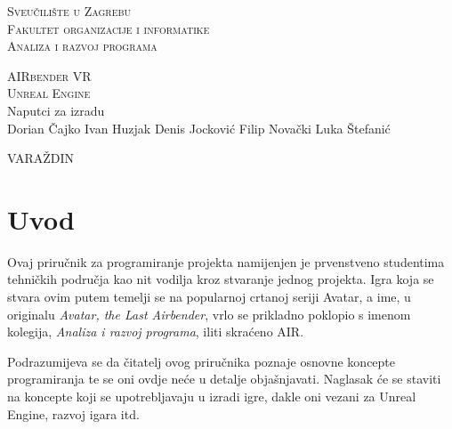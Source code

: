 \documentclass[a4paper,10pt]{article}
\begin{document}
\begin{center}
\textsc{Sveučilište u Zagrebu}\\
\textsc{Fakultet organizacije i informatike}\\
\textsc{Analiza i razvoj programa}
\end{center}
\vspace*{7cm}
\begin{center}
	\textsc{\huge AIRbender VR}\\
	\textsc{\large Unreal Engine}\\Naputci za izradu\\
	\vspace*{1cm}
	Dorian Čajko \quad Ivan Huzjak \quad Denis Jocković \quad  Filip
	Novački \quad Luka Štefanić
\end{center}
\hspace*{1cm}

\begin{center}\end{center}
\vspace*{7cm}

\begin{center}
VARA\v{Z}DIN
\end{center}

\pagebreak
\phantom{}
\pagebreak

\tableofcontents

\pagebreak
\phantom{}
\pagebreak

\pagestyle{fancy}

\section*{Uvod}

Ovaj priručnik za programiranje projekta namijenjen je prvenstveno studentima
tehničkih područja kao nit vodilja kroz stvaranje jednog projekta. Igra koja se
stvara ovim putem temelji se na popularnoj crtanoj seriji Avatar, a ime, u
originalu \textit{Avatar, the Last Airbender}, vrlo se prikladno poklopio s
imenom kolegija, \textit{Analiza i razvoj programa}, iliti skraćeno
AIR.

Podrazumijeva se da čitatelj ovog priručnika poznaje osnovne koncepte
programiranja te se oni ovdje neće u detalje objašnjavati. Naglasak će se
staviti na koncepte koji se upotrebljavaju u izradi igre, dakle oni vezani za
Unreal Engine, razvoj igara itd.
\end{document}
